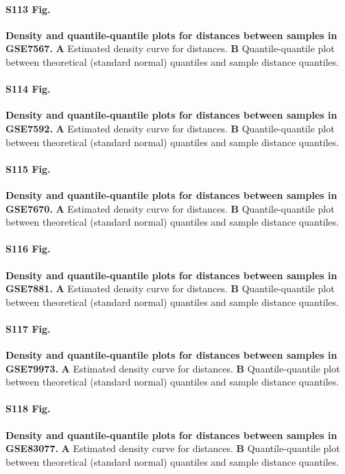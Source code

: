 \documentclass[10pt,letterpaper]{article}
\begin{document}
\paragraph*{S113 Fig.}
\hypertarget{S113_Fig}{
{\bf Density and quantile-quantile plots for distances between samples in GSE7567.} \textbf{A} Estimated density curve for distances. \textbf{B} Quantile-quantile plot between theoretical (standard normal) quantiles and sample distance quantiles.}

\paragraph*{S114 Fig.}
\hypertarget{S114_Fig}{
{\bf Density and quantile-quantile plots for distances between samples in GSE7592.} \textbf{A} Estimated density curve for distances. \textbf{B} Quantile-quantile plot between theoretical (standard normal) quantiles and sample distance quantiles.}

\paragraph*{S115 Fig.}
\hypertarget{S115_Fig}{
{\bf Density and quantile-quantile plots for distances between samples in GSE7670.} \textbf{A} Estimated density curve for distances. \textbf{B} Quantile-quantile plot between theoretical (standard normal) quantiles and sample distance quantiles.}

\paragraph*{S116 Fig.}
\hypertarget{S116_Fig}{
{\bf Density and quantile-quantile plots for distances between samples in GSE7881.} \textbf{A} Estimated density curve for distances. \textbf{B} Quantile-quantile plot between theoretical (standard normal) quantiles and sample distance quantiles.}

\paragraph*{S117 Fig.}
\hypertarget{S117_Fig}{
{\bf Density and quantile-quantile plots for distances between samples in GSE79973.} \textbf{A} Estimated density curve for distances. \textbf{B} Quantile-quantile plot between theoretical (standard normal) quantiles and sample distance quantiles.}

\paragraph*{S118 Fig.}
\hypertarget{S118_Fig}{
{\bf Density and quantile-quantile plots for distances between samples in GSE83077.} \textbf{A} Estimated density curve for distances. \textbf{B} Quantile-quantile plot between theoretical (standard normal) quantiles and sample distance quantiles.}
\end{document}
